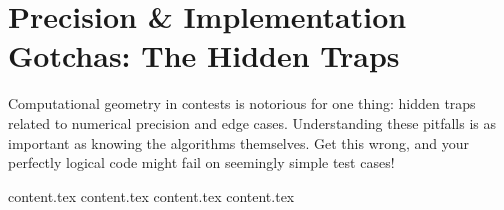 \clearpage
\section{Precision \& Implementation Gotchas: The Hidden Traps}
\label{sec:A.3}

Computational geometry in contests is notorious for one thing: hidden traps related to numerical precision and edge cases. Understanding these pitfalls is as important as knowing the algorithms themselves. Get this wrong, and your perfectly logical code might fail on seemingly simple test cases!

{content.tex}
{content.tex}
{content.tex}
{content.tex}